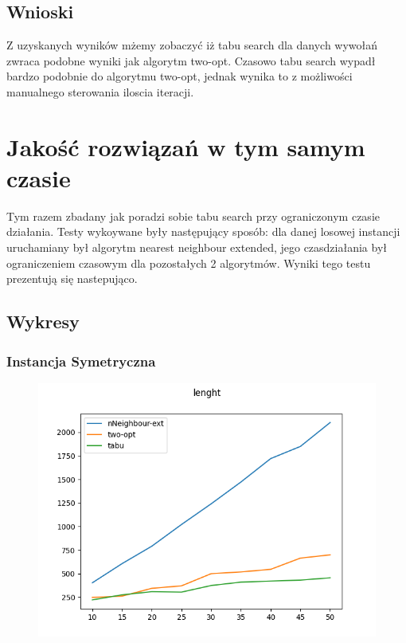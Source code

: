 \documentclass[11pt]{article}
\begin{document}
    \subsection{Wnioski }   
    Z uzyskanych wyników mżemy zobaczyć iż tabu search dla danych wywołań zwraca podobne wyniki 
    jak algorytm two-opt. Czasowo tabu search wypadł bardzo podobnie do algorytmu two-opt, jednak
    wynika to z możliwości manualnego sterowania iloscia iteracji. 







\section{Jakość rozwiązań w tym samym czasie }
        Tym razem zbadany jak poradzi sobie tabu search przy ograniczonym czasie działania.
        Testy wykoywane były następujący sposób: dla danej losowej instancji uruchamiany był algorytm
        nearest neighbour extended, jego czasdziałania był ograniczeniem czasowym dla pozostałych 2
        algorytmów. Wyniki tego testu prezentują się nastepująco.
    \subsection{Wykresy }
        \subsubsection{Instancja Symetryczna }
                \begin{center}
                \begin{figure}[H]

                    \includegraphics[scale=0.6]{timedSymetricLenght.png}

                \end{figure}
                \end{center}
\end{document}
